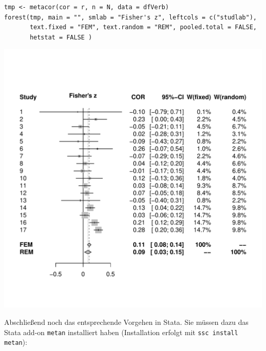 \documentclass[normalheadings, 10pt]{scrartcl}\usepackage{graphicx, color}
\makeatletter
\def\maxwidth{ %
  \ifdim\Gin@nat@width>\linewidth
    \linewidth
  \else
    \Gin@nat@width
  \fi
}
\newenvironment{kframe}{%
 \def\at@end@of@kframe{}%
 \ifinner\ifhmode%
  \def\at@end@of@kframe{\end{minipage}}%
  \begin{minipage}{\columnwidth}%
 \fi\fi%
 \def\FrameCommand##1{\hskip\@totalleftmargin \hskip-\fboxsep
 \colorbox{shadecolor}{##1}\hskip-\fboxsep
     \hskip-\linewidth \hskip-\@totalleftmargin \hskip\columnwidth}%
 \MakeFramed {\advance\hsize-\width
   \@totalleftmargin\z@ \linewidth\hsize
   \@setminipage}}%
 {\par\unskip\endMakeFramed%
 \at@end@of@kframe}
\newenvironment{knitrout}{}{} %
\newcommand{\code}[1]{\texttt{#1}}
\makeatother
\begin{document}
\begin{rbsp}
\begin{knitrout}
\color{fgcolor}\begin{kframe}
\begin{verbatim}
tmp <- metacor(cor = r, n = N, data = dfVerb)
forest(tmp, main = "", smlab = "Fisher's z", leftcols = c("studlab"),
       text.fixed = "FEM", text.random = "REM", pooled.total = FALSE,
       hetstat = FALSE )
\end{verbatim}
\end{kframe}
\includegraphics[width=\maxwidth]{fig/assign-2-1-1_4} 

\end{knitrout}

\end{rbsp}


Abschließend noch das entsprechende Vorgehen in Stata. Sie müssen dazu das Stata
add-on \code{metan} installiert haben (Installation erfolgt mit \code{ssc
  install metan}):

\begin{statabsp}
  
\end{statabsp}


\begin{statabsp}
  \begin{tiny}
    
  \end{tiny}
\end{statabsp}
\end{document}
